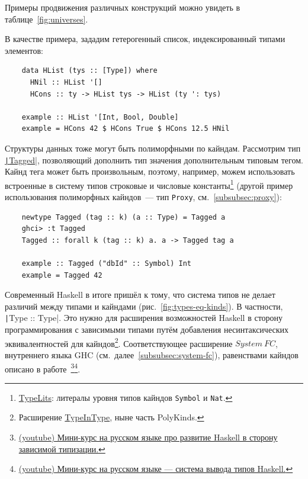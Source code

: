 Примеры продвижения различных конструкций можно увидеть в таблице~\ref{fig:universes}.

В качестве примера, зададим гетерогенный список, индексированный типами элементов:
\begin{verbatim}
    data HList (tys :: [Type]) where
      HNil :: HList '[]
      HCons :: ty -> HList tys -> HList (ty ': tys)

    example :: HList '[Int, Bool, Double]
    example = HCons 42 $ HCons True $ HCons 12.5 HNil
\end{verbatim}

Структуры данных тоже могут быть полиморфными по кайндам.
Рассмотрим тип \href{https://hackage.haskell.org/package/tagged-0.8.8/docs/Data-Tagged.html#t:Tagged}{\texttt|Tagged|}, позволяющий дополнить тип значения дополнительным типовым тегом.
Кайнд тега может быть произвольным, поэтому, например, можем использовать встроенные в систему типов строковые и числовые константы\footnote{\href{https://ghc.gitlab.haskell.org/ghc/doc/users_guide/exts/type_literals.html}{TypeLits}: литералы уровня типов кайндов \texttt{Symbol} и \texttt{Nat}.} (другой пример использования полиморфных кайндов~--- тип \texttt{Proxy}, см.~\ref{subsubsec:proxy}):
\begin{verbatim}
    newtype Tagged (tag :: k) (a :: Type) = Tagged a
    ghci> :t Tagged
    Tagged :: forall k (tag :: k) a. a -> Tagged tag a

    example :: Tagged ("dbId" :: Symbol) Int
    example = Tagged 42
\end{verbatim}

Современный Haskell в итоге пришёл к тому, что система типов не делает различий между типами и кайндами (рис.~\ref{fig:types-eq-kinds}).
В частности, \texttt|Type :: Type|.
Это нужно для расширения возможностей Haskell в сторону программирования с зависимыми типами путём добавления несинтаксических эквивалентностей для кайндов\footnote{Расширение \href{https://ghc.gitlab.haskell.org/ghc/doc/users_guide/exts/poly_kinds.html\#extension-TypeInType}{TypeInType}, ныне часть PolyKinds.}.
Соответствующее расширение $System~FC$, внутреннего языка GHC (см.\ далее~\ref{subsubsec:system-fc}), равенствами кайндов описано в работе~\cite{weirich2013system}\footnote{\href{https://www.youtube.com/watch?v=ISGENChlA4M&list=PLvPsfYrGz3wufQguebnCduYgQQ9UMeJRt}{(youtube) Мини-курс на русском языке про развитие Haskell в сторону зависимой типизации.}}\footnote{\href{https://www.youtube.com/watch?v=_HYI7zjkrEs&list=PLvPsfYrGz3wuVAGhNf6-i7uafXg56oqM5&index=1}{(youtube) Мини-курс на русском языке --- система вывода типов Haskell.}}.

